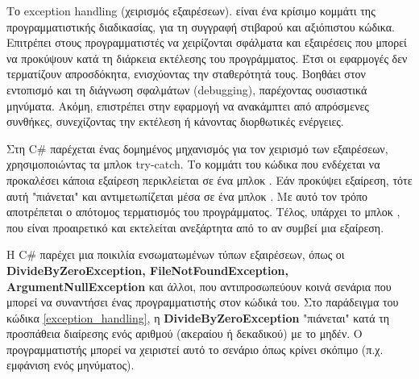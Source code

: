 Το exception handling (χειρισμός εξαιρέσεων). είναι ένα κρίσιμο κομμάτι της προγραμματιστικής διαδικασίας, για τη συγγραφή στιβαρού και αξιόπιστου κώδικα. Επιτρέπει στους προγραμματιστές να χειρίζονται σφάλματα και εξαιρέσεις που μπορεί να προκύψουν κατά τη διάρκεια εκτέλεσης του προγράμματος. Έτσι οι εφαρμογές δεν τερματίζουν απροσδόκητα, ενισχύοντας την σταθερότητά τους. Βοηθάει στον εντοπισμό και τη διάγνωση σφαλμάτων (debugging), παρέχοντας ουσιαστικά μηνύματα. Ακόμη, επιστρέπει στην εφαρμογή να ανακάμπτει από απρόσμενες συνθήκες, συνεχίζοντας την εκτέλεση ή κάνοντας διορθωτικές ενέργειες.

Στη C\# παρέχεται ένας δομημένος μηχανισμός για τον χειρισμό των εξαιρέσεων, χρησιμοποιώντας τα μπλοκ try-catch. Το κομμάτι του κώδικα που ενδέχεται να προκαλέσει κάποια εξαίρεση περικλείεται σε ένα μπλοκ . Εάν προκύψει εξαίρεση, τότε αυτή "πιάνεται" και αντιμετωπίζεται μέσα σε ένα μπλοκ . Με αυτό τον τρόπο αποτρέπεται ο απότομος τερματισμός του προγράμματος. Τέλος, υπάρχει το μπλοκ , που είναι προαιρετικό και εκτελείται ανεξάρτητα από το αν συμβεί μια εξαίρεση. 

Η C\# παρέχει μια ποικιλία ενσωματωμένων τύπων εξαιρέσεων, όπως οι \linebreak \textbf{DivideByZeroException, FileNotFoundException, ArgumentNullException} και άλλοι, που αντιπροσωπεύουν κοινά σενάρια που μπορεί να συναντήσει ένας προγραμματιστής στον κώδικά του. Στο παράδειγμα του κώδικα \ref{exception_handling}, η \linebreak \textbf{DivideByZeroException} "πιάνεται" κατά τη προσπάθεια διαίρεσης ενός αριθμού (ακεραίου ή δεκαδικού) με το μηδέν. Ο προγραμματιστής μπορεί να χειριστεί αυτό το σενάριο όπως κρίνει σκόπιμο (π.χ. εμφάνιση ενός μηνύματος). 

